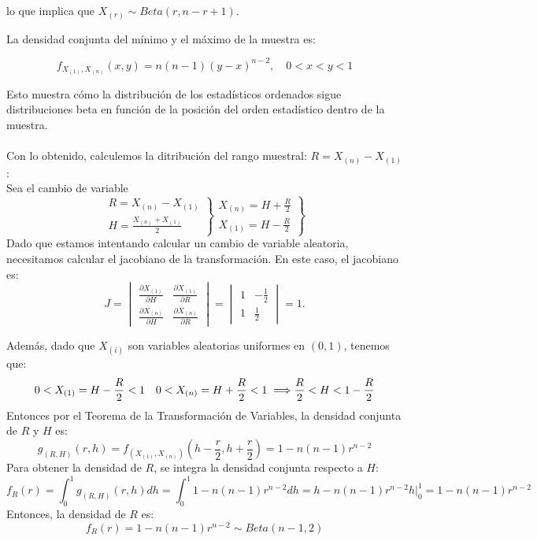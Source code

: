 {	lo que implica que $X_{(r)} \sim Beta(r, n-r+1)$.

	La densidad conjunta del mínimo y el máximo de la muestra es:

	$$ f_{X_{(1)}, X_{(n)}}(x,y) = n(n-1)(y-x)^{n-2}, \quad 0 < x < y < 1 $$

	Esto muestra cómo la distribución de los estadísticos ordenados sigue distribuciones beta en función de la posición del orden estadístico dentro de la muestra.
	\\\\
	Con lo obtenido, calculemos la ditribución del rango muestral: $R = X_{(n)} - X_{(1)}$: \\
	Sea el cambio de variable $$	\left.\left.\begin{array}{l}
		R=X_{(n)}-X_{(1)} \\
		H=\frac{X_{(n)}+X_{(1)}}{2}
	\end{array}\right\} \begin{array}{c}
		X_{(n)}=H+\frac{R}{2} \\
		X_{(1)}=H-\frac{R}{2}
	\end{array}\right\}$$ 
	Dado que estamos intentando calcular un cambio de variable aleatoria, necesitamos calcular el jacobiano de la transformación. En este caso, el jacobiano es:
\[
J=
\begin{vmatrix}
\frac{\partial{X_{(1)}}}{\partial{H}} & \frac{\partial{X_{(1)}}}{\partial{R}} \\ 
\frac{\partial{X_{(n)}}}{\partial{H}} & \frac{\partial{X_{(n)}}}{\partial{R}} 
\end{vmatrix}
=
\begin{vmatrix}
1 & -\frac{1}{2} \\ 
1 & \frac{1}{2}
\end{vmatrix}
= 1.
\]

	Además, dado que $X_{(i)}$ son variables aleatorias uniformes en $(0,1)$, tenemos que: \\
	$$ 0 < X_{(1)} = H - \frac{R}{2} < 1 \quad 0 < X_{(n)} = H + \frac{R}{2} < 1 \implies \\ \frac{R}{2} < H < 1 - \frac{R}{2}$$
	Entonces por el Teorema de la Transformación de Variables, la densidad conjunta de $R$ y $H$ es:
	$$ g_{(R,H)}(r,h)=f_{(X_{(1)},X_{(n)})}\left(h-\frac{r}{2},h+\frac{r}{2}\right)=1-n(n-1)r^{n-2} $$
	Para obtener la densidad de $R$, se integra la densidad conjunta respecto a $H$:
	$$ f_{R}(r)=\int_{0}^{1}g_{(R,H)}(r,h)dh=\int_{0}^{1}1-n(n-1)r^{n-2}dh=h-n(n-1)r^{n-2}h\Big|_{0}^{1}=1-n(n-1)r^{n-2} $$
	Entonces, la densidad de $R$ es:
	$$ f_{R}(r)=1-n(n-1)r^{n-2} \sim Beta(n-1,2) $$
}


